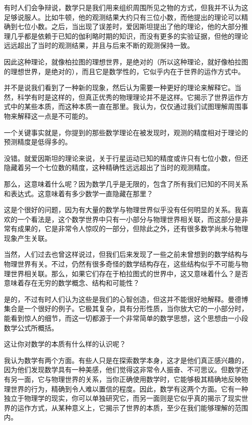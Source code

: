 \documentclass{article}
\begin{document}
有时人们会争辩说，数学只是我们用来组织周围所见之物的方式，但我并不认为这足够说服人。比如牛顿，他的观测结果大约只有三位小数，而他提出的理论可以精确到七位小数。之后，当出现了误差时，爱因斯坦提出了他的理论，他的大部分推理几乎都是依赖于已知的伽利略时期的知识，而没有更多的实验证据，但他的理论远远超出了当时的观测结果，并且与后来不断的观测保持一致。

因此这种理论，就像柏拉图的理想世界，是绝对的（所以这种理论，就好像柏拉图的理想世界，是绝对的），而且它是数学性的，它似乎内在于世界的运作方式中。

并不是说我们看到了一种新的现象，然后认为需要一种更好的理论来解释它。当然，科学有时是这样的，但真正优秀的物理理论并不是这样。它揭示了世界运作方式中的某些本质，而这种本质一直在那里。我认为，仅仅通过我们试图理解周围事物来解释这一点是不可能的。

一个关键事实就是，你提到的那些数学理论在被发现时，观测的精度相对于理论的预测精度是低得多的。

没错。就爱因斯坦的理论来说，关于行星运动已知的精度或许只有七位小数，但还隐藏着另一个七位数的精度，这种精确性远远超出了当时的观测精度。

那么，这意味着什么呢？因为数学几乎是无限的，包含了所有我们已知的不同关系和表达式。这意味着有多少数学一直隐藏在那里？

这是个很好的问题，因为有大量的数学与物理世界似乎没有任何明显的关系。我喜欢的一个看法是，这个数学世界中只有一小部分与物理世界相关联，而这部分是非常有成果的，它是非常令人惊叹的一部分，但除此之外，还有很多数学尚未与物理现象产生关联。

当然，人们过去也曾这样说过，但我们后来发现了一些之前未曾想到的数学结构与物理世界有关。不过，仍然有很多奇怪的数学结构存在，这些结构似乎不可能与物理世界相关联。那么，如果它们存在于柏拉图式的世界中，这又意味着什么？是否意味着存在无穷的数学概念、结构和可能性？

是的，不过有时人们认为这些是我们的心智创造，但这并不能很好地解释。曼德博集合是一个很好的例子。它极其复杂，具有分形性质，当你放大它的一小部分时，能看到惊人的细节，而这一切都源于一个非常简单的数学思想，这个思想由一小段数学公式所概括。

这让你对数学的本质有什么样的认识呢？

我认为数学有两个方面。有些人只是在探索数学本身，这才是他们真正感兴趣的，因为他们发现数学具有一种美感，他们觉得这非常令人振奋、不可思议。但数学还有另一面，它与物理世界的关系，当你正确使用数学时，它能够极其精确地反映物理世界的行为，精确到令人难以置信的程度。因此，数学有这两个方面。它有一种独立于物理学的现实，你可以单独研究它，而另一面则是它似乎真的揭示了现实世界的运作方式，从某种意义上，它揭示了世界的本质，至少在我们能够理解的范围内。
\end{document}
